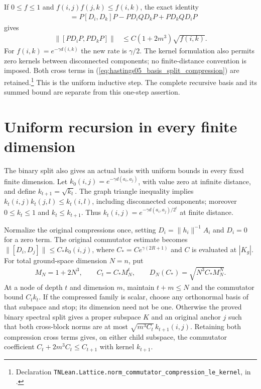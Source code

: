 \documentclass{article}
\providecommand{\leanid}[1]{\nolinkurl{#1}}
\begin{document}
If $0\le f\le1$ and $f(i,j)f(j,k)\le f(i,k)$, the exact identity
\begin{align}
 [PD_iP,PD_kP]
 &=P[D_i,D_k]P-PD_iQD_kP+PD_kQD_iP
 \label{eq:hastings05_basis_split_compression}
\end{align}
gives
\begin{align}
 \|[PD_iP,PD_kP]\|
 &\le C(1+2m^3)\sqrt{f(i,k)}.
 \label{eq:hastings05_basis_split_child}
\end{align}
For $f(i,k)=e^{-\gamma d(i,k)}$ the new rate is $\gamma/2$.
The kernel formulation also permits zero kernels between disconnected
components; no finite-distance convention is imposed. Both cross terms in
(\ref{eq:hastings05_basis_split_compression}) are retained.\footnote{Declaration
\leanid{TNLean.Lattice.norm_commutator_compression_le_kernel}, in
.}
This is the uniform inductive step. The complete recursive basis and its
summed bound are separate from this one-step assertion.

\section{Uniform recursion in every finite dimension}

The binary split also gives an actual basis with uniform bounds in every fixed
finite dimension. Let $k_0(i,j)=e^{-\gamma d(a_i,a_j)}$, with value zero at
infinite distance, and define $k_{t+1}=\sqrt{k_t}$. The graph triangle inequality
implies $k_t(i,j)k_t(j,l)\le k_t(i,l)$, including disconnected components;
moreover $0\le k_t\le1$ and $k_t\le k_{t+1}$.
Thus $k_t(i,j)=e^{-\gamma d(a_i,a_j)/2^t}$ at finite distance.

Normalize the original compressions once, setting $D_i=\|h_i\|^{-1}A_i$ and
$D_i=0$ for a zero term. The original commutator estimate becomes
$\|[D_i,D_j]\|\le C_*k_0(i,j)$, where
$C_*=Ce^{\gamma(2R+1)}$ and $C$ is evaluated at $|K_g|$.
For total ground-space dimension $N=n$, put
\begin{align}
 M_N=1+2N^3,\qquad C_t=C_*M_N^t,\qquad
 D_N(C_*)=\sqrt{N^3C_*M_N^N}.
 \label{eq:hastings05_basis_recursive_coeff}
\end{align}
At a node of depth $t$ and dimension $m$, maintain $t+m\le N$ and the
commutator bound $C_tk_t$. If the compressed family is scalar, choose any
orthonormal basis of that subspace and stop; its dimension need not be one.
Otherwise the proved binary spectral split gives a proper subspace $K$ and an
original anchor $j$ such that both cross-block norms are at most
$\sqrt{m^3C_t}\,k_{t+1}(i,j)$. Retaining both compression cross terms gives,
on either child subspace, the commutator coefficient
$C_t+2m^3C_t\le C_{t+1}$ with kernel $k_{t+1}$.
\end{document}
